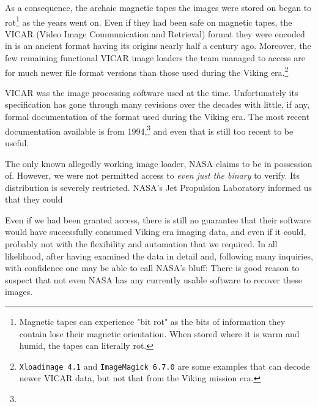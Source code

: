     {}

As a consequence, the archaic magnetic tapes the images were stored on began to rot\footnote{Magnetic tapes can experience "bit rot" as the bits of information they contain lose their magnetic orientation. When stored where it is warm and humid, the tapes can literally rot.} as the years went on. Even if they had been safe on magnetic tapes, the VICAR (Video Image Communication and Retrieval) format they were encoded in is an ancient format having its origins nearly half a century ago. Moreover, the few remaining functional VICAR image loaders the team managed to access are for much newer file format versions than those used during the Viking era.\footnote{{\tt Xloadimage 4.1} and {\tt ImageMagick 6.7.0} are some examples that can decode newer VICAR data, but not that from the Viking mission era.}

VICAR was the image processing software used at the time. Unfortunately its specification has gone through many revisions over the decades with little, if any, formal documentation of the format used during the Viking era. The most recent documentation available is from 1994,\footnote{} and even that is still too recent to be useful.

The only known allegedly working image loader, NASA claims to be in possession of. However, we were not permitted access to {\it even just the binary} to verify. Its distribution is severely restricted. NASA's Jet Propulsion Laboratory informed us that they could 

Even if we had been granted access, there is still no guarantee that their software would have successfully consumed Viking era imaging data, and even if it could, probably not with the flexibility and automation that we required. In all likelihood, after having examined the data in detail and, following many inquiries, with confidence one may be able to call NASA's bluff: There is good reason to suspect that not even NASA has any currently usable software to recover these images.

